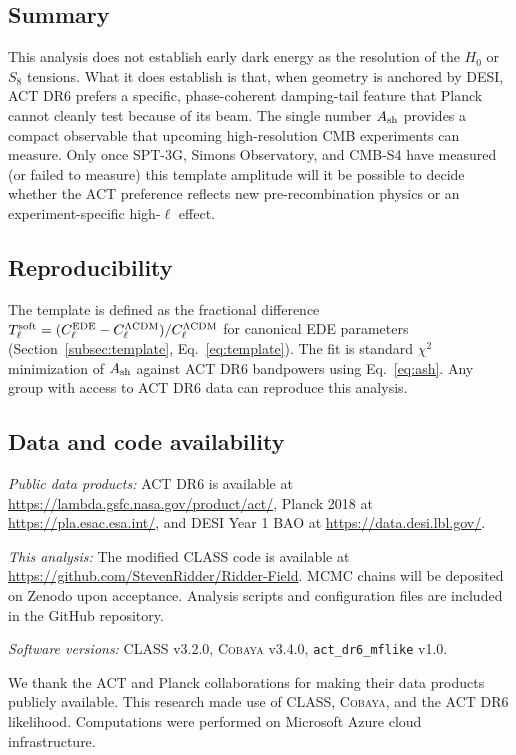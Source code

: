 \documentclass[onecolumn,showpacs,preprintnumbers,amsmath,amssymb,prd]{revtex4-2}
\begin{document}
\subsection{Summary}

This analysis does not establish early dark energy as the resolution of the 
$H_0$ or $S_8$ tensions. What it does establish is that, when geometry is 
anchored by DESI, ACT DR6 prefers a specific, phase-coherent damping-tail 
feature that Planck cannot cleanly test because of its beam. The single 
number $A_{\rm sh}$ provides a compact observable that upcoming high-resolution 
CMB experiments can measure. Only once SPT-3G, Simons Observatory, and CMB-S4 
have measured (or failed to measure) this template amplitude will it be 
possible to decide whether the ACT preference reflects new pre-recombination 
physics or an experiment-specific high-$\ell$ effect.

\subsection{Reproducibility}

The template is defined as the fractional difference 
$T_\ell^{\rm soft} = (C_\ell^{\rm EDE} - C_\ell^{\rm \Lambda CDM})/C_\ell^{\rm \Lambda CDM}$ 
for canonical EDE parameters (Section~\ref{subsec:template}, Eq.~\ref{eq:template}). 
The fit is standard $\chi^2$ minimization of $A_{\rm sh}$ against ACT DR6 bandpowers 
using Eq.~\ref{eq:ash}. Any group with access to ACT DR6 data can reproduce 
this analysis.

\subsection{Data and code availability}

\emph{Public data products:} ACT DR6 is available at \url{https://lambda.gsfc.nasa.gov/product/act/}, Planck 2018 at \url{https://pla.esac.esa.int/}, and DESI Year 1 BAO at \url{https://data.desi.lbl.gov/}.

\emph{This analysis:} The modified \textsc{CLASS} code is available at \url{https://github.com/StevenRidder/Ridder-Field}. MCMC chains will be deposited on Zenodo upon acceptance. Analysis scripts and configuration files are included in the GitHub repository.

\emph{Software versions:} \textsc{CLASS} v3.2.0, \textsc{Cobaya} v3.4.0, 
\texttt{act\_dr6\_mflike} v1.0.

\begin{acknowledgments}
We thank the ACT and Planck collaborations for making their data products 
publicly available. This research made use of \textsc{CLASS}, \textsc{Cobaya}, 
and the ACT DR6 likelihood. Computations were performed on Microsoft Azure 
cloud infrastructure.
\end{acknowledgments}
\end{document}
